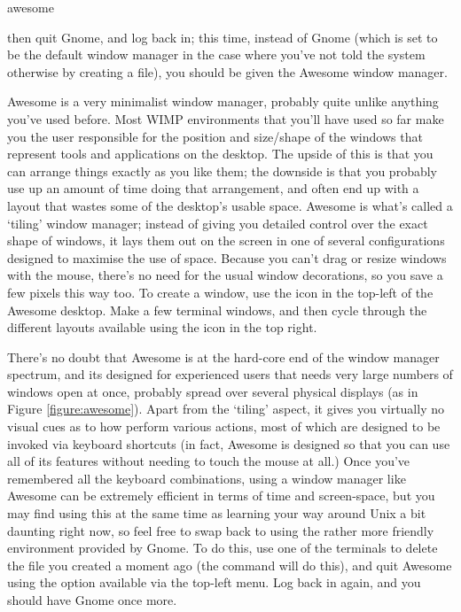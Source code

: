 \begin{ttoutenv}
awesome
\end{ttoutenv}

then quit Gnome, and log back in; this time, instead of Gnome (which is set to be the default window manager in the case where you've not told the system otherwise by creating a  file), you should be given the Awesome window manager.

Awesome is a very minimalist window manager, probably quite unlike anything you've used before. Most WIMP environments that you'll have used so far make you the user responsible for the position and size/shape of the windows that represent tools and applications on the desktop. The upside of this is that you can arrange things exactly as you like them; the downside is that you probably use up an amount of time doing that arrangement, and often end up with a layout that wastes some of the desktop's usable space. Awesome is what's called a `tiling' window manager; instead of giving you detailed control over the exact shape of windows, it lays them out on the screen in one of several configurations designed to maximise the use of space. Because you can't drag or resize windows with the mouse, there's no need for the usual window decorations, so you save a few pixels this way too. To create a window, use the icon in the top-left of the Awesome desktop. Make a few terminal windows, and then cycle through the different layouts available using the icon in the top right. 

There's no doubt that Awesome is at the hard-core end of the window manager spectrum, and its designed for experienced users that needs very large numbers of windows open at once, probably spread over several physical displays (as in Figure \ref{figure:awesome}). Apart from the `tiling' aspect, it gives you virtually no visual cues as to how perform various actions, most of which are designed to be invoked via keyboard shortcuts (in fact, Awesome is designed so that you can use all of its features without needing to touch the mouse at all.) Once you've remembered all the keyboard combinations, using a window manager like Awesome can be extremely efficient in terms of time and screen-space, but you may find using this at the same time as learning your way around Unix a bit daunting right now, so feel free to swap back to using the rather more friendly environment provided by Gnome. To do this, use one of the terminals to delete the  file you created a moment ago (the command  will do this), and quit Awesome using the option available via the top-left menu. Log back in again, and you should have Gnome once more. 


